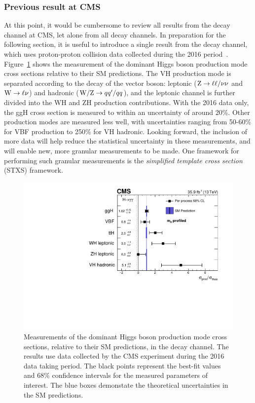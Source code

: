 \subsubsection{Previous \Hgg result at CMS}
At this point, it would be cumbersome to review all results from the \Hgg decay channel at CMS, let alone from all decay channels. In preparation for the following section, it is useful to introduce a single result from the \Hgg decay channel, which uses proton-proton collision data collected during the 2016 period~\cite{Sirunyan:2018ouh}. Figure~\ref{fig:hig16040_stage0} shows the measurement of the dominant Higgs boson production mode cross sections relative to their SM predictions. The VH production mode is separated according to the decay of the vector boson: leptonic (${\rm{Z}}\rightarrow\ell\ell/\nu\nu$ and ${\rm{W}}\rightarrow\ell\nu$) and hadronic (${\rm{W/Z}}\rightarrow qq'/qq$), and the leptonic channel is further divided into the WH and ZH production contributions. With the 2016 data only, the ggH cross section is measured to within an uncertainty of around 20\%. Other production modes are measured less well, with uncertainties ranging from 50-60\% for VBF production to 250\% for VH hadronic. Looking forward, the inclusion of more data will help reduce the statistical uncertainty in these measurements, and will enable new, more granular measurements to be made. One framework for performing such granular measurements is the \textit{simplified template cross section} (STXS) framework.

\begin{figure}[htb!]
  \centering
  \includegraphics[width=.7\linewidth]{Figures/theory/hig16040_stage0.pdf}
  \caption[Measurements of Higgs boson production cross section in the \Hgg channel, using the 2016 data set]
  {
    Measurements of the dominant Higgs boson production mode cross sections, relative to their SM predictions, in the \Hgg decay channel. The results use data collected by the CMS experiment during the 2016 data taking period. The black points represent the best-fit values and 68\% confidence intervals for the measured parameters of interest. The blue boxes demonstate the theoretical uncertainties in the SM predictions.
  }
  \label{fig:hig16040_stage0}
\end{figure}

